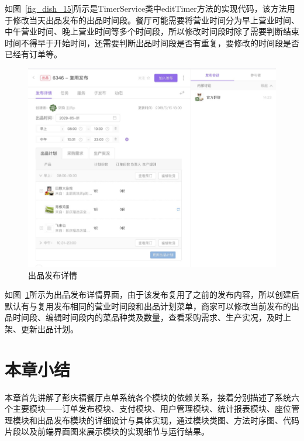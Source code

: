 如图~\ref{fig_dish_15}所示是TimerService类中editTimer方法的实现代码，该方法用于修改当天出品发布的出品时间段。餐厅可能需要将营业时间分为早上营业时间、中午营业时间、晚上营业时间等多个时间段，所以修改时间段时除了需要判断结束时间不得早于开始时间，还需要判断出品时间段是否有重复，要修改的时间段是否已经有订单等。

\begin{figure}[htbp!]
    \centering
    \includegraphics[width=4.5in]{FIGs/chapter4/dish_detail.pdf}
    \caption{出品发布详情}\label{fig_dish_detail}
\end{figure}

如图~\ref{fig_dish_detail}所示为出品发布详情界面，由于该发布复用了之前的发布内容，所以创建后默认有与复用发布相同的营业时间段和出品计划菜单，商家可以修改当前发布的出品时间段、编辑时间段内的菜品种类及数量，查看采购需求、生产实况，及时上架、更新出品计划。\\

\section{本章小结}
本章首先讲解了彭庆福餐厅点单系统各个模块的依赖关系，接着分别描述了系统六个主要模块——订单发布模块、支付模块、用户管理模块、统计报表模块、座位管理模块和出品发布模块的详细设计与具体实现，通过模块类图、方法时序图、代码片段以及前端界面图来展示模块的实现细节与运行结果。